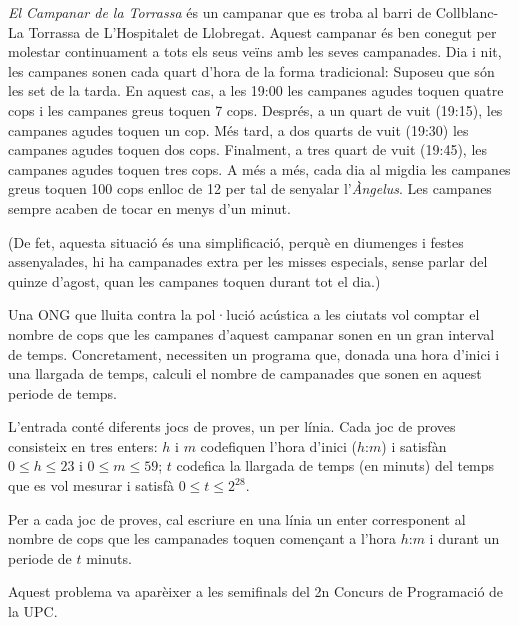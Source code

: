 

\Statement


\emph{El Campanar de la Torrassa} és un campanar que es troba al barri de
Collblanc-La Torrassa de L'Hospitalet de Llobregat. Aquest campanar és ben
conegut per molestar continuament a tots els seus veïns amb les seves
campanades.
Dia i nit, les campanes sonen cada quart d'hora de la forma
tradicional: Suposeu que són les set de la tarda. En aquest
cas, a les 19:00 les campanes agudes toquen quatre cops i les campanes
greus toquen 7 cops. Després, a un quart de vuit (19:15),
les campanes agudes toquen un cop. Més tard, a dos quarts de vuit
(19:30) les campanes agudes toquen dos cops. Finalment,
a tres quart de vuit (19:45), les campanes agudes toquen tres cops.
A més a més, cada dia al migdia les campanes greus toquen 100 cops enlloc
de 12 per tal de senyalar l'\emph{Àngelus}. Les campanes sempre
acaben de tocar en menys d'un minut.

\medskip

(De fet, aquesta situació és una simplificació, perquè en diumenges
i festes assenyalades, hi ha campanades extra per les misses 
especials, sense parlar del quinze d'agost, quan les campanes toquen durant
tot el dia.)

\medskip

Una ONG que lluita contra la pol·lució acústica a les ciutats
vol comptar el nombre de cops que les campanes d'aquest campanar
sonen en un gran interval de temps. Concretament, necessiten un
programa que, donada una hora d'inici i una llargada de temps,
calculi el nombre de campanades que sonen en aquest periode de temps.


\Input

L'entrada conté diferents jocs de proves, un per línia. Cada joc de proves
consisteix en tres enters: $h$ i $m$ codefiquen l'hora d'inici ($h$:$m$) i
satisfàn $0\le h\le 23$ i $0\le m\le 59$; $t$ codefica la llargada de temps
(en minuts) del temps que es vol mesurar i satisfà $0\le t\le2^{28}$. 

\Output

Per a cada joc de proves, cal escriure en una línia un enter corresponent
al nombre de cops que les campanades toquen començant a l'hora $h$:$m$ 
i durant un periode de $t$
minuts.

\Sample

\Observation

Aquest problema va aparèixer a les semifinals del 2n Concurs de Programació de
la UPC.
